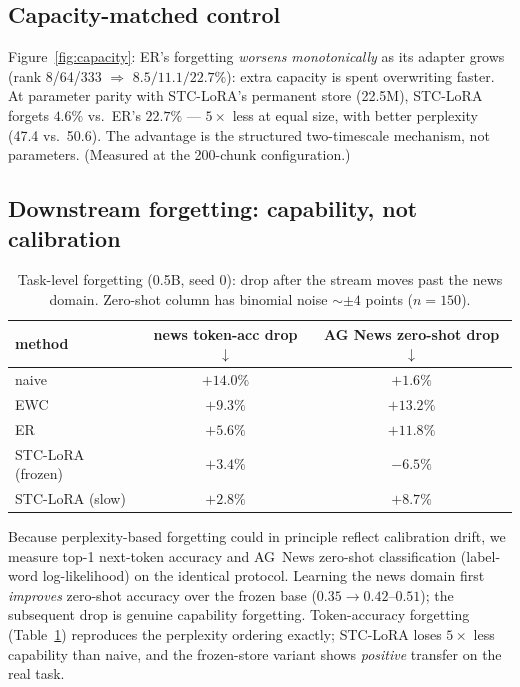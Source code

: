 \documentclass{article}
\newcommand{\stc}{STC-LoRA}
\newcommand{\best}[1]{\bm{#1}}   %
\begin{document}
\subsection{Capacity-matched control}
Figure~\ref{fig:capacity}: ER's forgetting \emph{worsens monotonically} as its adapter grows (rank 8/64/333 $\Rightarrow$ $8.5/11.1/22.7\%$): extra capacity is spent overwriting faster. At parameter parity with \stc{}'s permanent store (22.5M), \stc{} forgets $4.6\%$ vs.\ ER's $22.7\%$ --- $5\times$ less at equal size, with better perplexity (47.4 vs.\ 50.6). The advantage is the structured two-timescale mechanism, not parameters. (Measured at the 200-chunk configuration.)

\subsection{Downstream forgetting: capability, not calibration}\label{sec:downstream}
\begin{table}[t]
\centering\small
\caption{Task-level forgetting (0.5B, seed 0): drop after the stream moves past the news domain. Zero-shot column has binomial noise ${\sim}\pm4$ points ($n{=}150$).}
\label{tab:downstream}
\begin{tabular}{lcc}
\toprule
method & news token-acc drop $\downarrow$ & AG News zero-shot drop $\downarrow$ \\
\midrule
naive & $+14.0\%$ & $+1.6\%$ \\
EWC & $+9.3\%$ & $+13.2\%$ \\
ER & $+5.6\%$ & $+11.8\%$ \\
\stc{} (frozen) & $+3.4\%$ & $\best{-6.5\%}$ \\
\stc{} (slow) & $\best{+2.8\%}$ & $+8.7\%$ \\
\bottomrule
\end{tabular}
\end{table}

Because perplexity-based forgetting could in principle reflect calibration drift, we measure top-1 next-token accuracy and AG~News zero-shot classification (label-word log-likelihood) on the identical protocol. Learning the news domain first \emph{improves} zero-shot accuracy over the frozen base ($0.35\rightarrow0.42$--$0.51$); the subsequent drop is genuine capability forgetting. Token-accuracy forgetting (Table~\ref{tab:downstream}) reproduces the perplexity ordering exactly; \stc{} loses $5\times$ less capability than naive, and the frozen-store variant shows \emph{positive} transfer on the real task.
\end{document}
